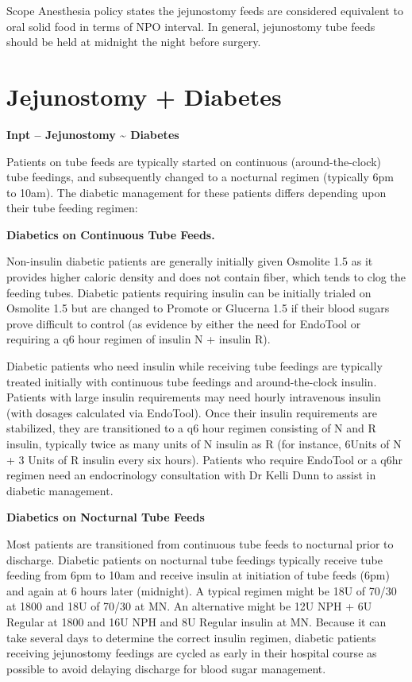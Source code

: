 \documentclass[
  letterpaper,
]{scrbook}
\begin{document}
Scope Anesthesia policy states the jejunostomy feeds are considered
equivalent to oral solid food in terms of NPO interval. In general,
jejunostomy tube feeds should be held at midnight the night before
surgery.

\chapter{Jejunostomy + Diabetes}\label{jejunostomy_diabetes}

\textbf{Inpt -- Jejunostomy \textasciitilde{} Diabetes}

Patients on tube feeds are typically started on continuous
(around-the-clock) tube feedings, and subsequently changed to a
nocturnal regimen (typically 6pm to 10am). The diabetic management for
these patients differs depending upon their tube feeding regimen:

\textbf{Diabetics on Continuous Tube Feeds.}

Non-insulin diabetic patients are generally initially given Osmolite 1.5
as it provides higher caloric density and does not contain fiber, which
tends to clog the feeding tubes. Diabetic patients requiring insulin can
be initially trialed on Osmolite 1.5 but are changed to Promote or
Glucerna 1.5 if their blood sugars prove difficult to control (as
evidence by either the need for EndoTool or requiring a q6 hour regimen
of insulin N + insulin R).

Diabetic patients who need insulin while receiving tube feedings are
typically treated initially with continuous tube feedings and
around-the-clock insulin. Patients with large insulin requirements may
need hourly intravenous insulin (with dosages calculated via EndoTool).
Once their insulin requirements are stabilized, they are transitioned to
a q6 hour regimen consisting of N and R insulin, typically twice as many
units of N insulin as R (for instance, 6Units of N + 3 Units of R
insulin every six hours). Patients who require EndoTool or a q6hr
regimen need an endocrinology consultation with Dr Kelli Dunn to assist
in diabetic management.

\textbf{Diabetics on Nocturnal Tube Feeds}

Most patients are transitioned from continuous tube feeds to nocturnal
prior to discharge. Diabetic patients on nocturnal tube feedings
typically receive tube feeding from 6pm to 10am and receive insulin at
initiation of tube feeds (6pm) and again at 6 hours later (midnight). A
typical regimen might be 18U of 70/30 at 1800 and 18U of 70/30 at MN. An
alternative might be 12U NPH + 6U Regular at 1800 and 16U NPH and 8U
Regular insulin at MN. Because it can take several days to determine the
correct insulin regimen, diabetic patients receiving jejunostomy
feedings are cycled as early in their hospital course as possible to
avoid delaying discharge for blood sugar management.
\end{document}
